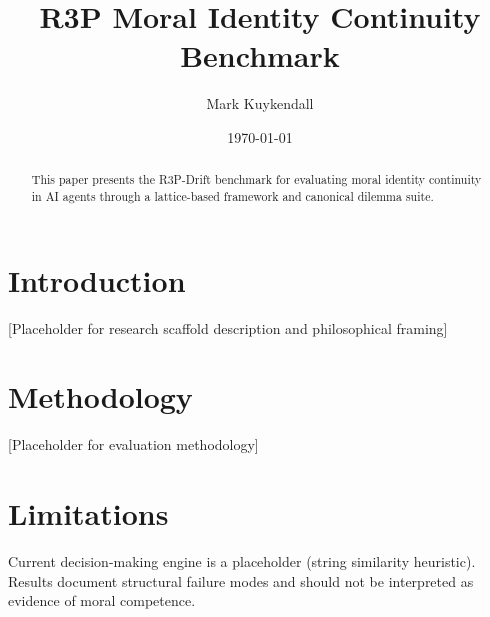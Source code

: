 \documentclass{article}
\title{R3P Moral Identity Continuity Benchmark}
\author{Mark Kuykendall}
\date{\today}
\begin{document}
\maketitle

\begin{abstract}
This paper presents the R3P-Drift benchmark for evaluating moral identity continuity in AI agents through a lattice-based framework and canonical dilemma suite.
\end{abstract}

\section{Introduction}
[Placeholder for research scaffold description and philosophical framing]

\section{Methodology}
[Placeholder for evaluation methodology]

\section{Limitations}
Current decision-making engine is a placeholder (string similarity heuristic). Results document structural failure modes and should not be interpreted as evidence of moral competence.
\end{document}
